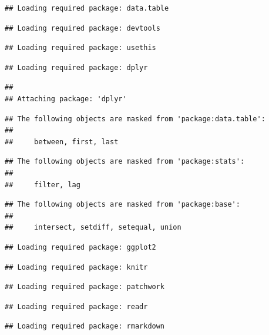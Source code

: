 \documentclass[
  10pt,
]{scrbook}
\begin{document}
\begin{verbatim}
## Loading required package: data.table
\end{verbatim}

\begin{verbatim}
## Loading required package: devtools
\end{verbatim}

\begin{verbatim}
## Loading required package: usethis
\end{verbatim}

\begin{verbatim}
## Loading required package: dplyr
\end{verbatim}

\begin{verbatim}
## 
## Attaching package: 'dplyr'
\end{verbatim}

\begin{verbatim}
## The following objects are masked from 'package:data.table':
## 
##     between, first, last
\end{verbatim}

\begin{verbatim}
## The following objects are masked from 'package:stats':
## 
##     filter, lag
\end{verbatim}

\begin{verbatim}
## The following objects are masked from 'package:base':
## 
##     intersect, setdiff, setequal, union
\end{verbatim}

\begin{verbatim}
## Loading required package: ggplot2
\end{verbatim}

\begin{verbatim}
## Loading required package: knitr
\end{verbatim}

\begin{verbatim}
## Loading required package: patchwork
\end{verbatim}

\begin{verbatim}
## Loading required package: readr
\end{verbatim}

\begin{verbatim}
## Loading required package: rmarkdown
\end{verbatim}
\end{document}
